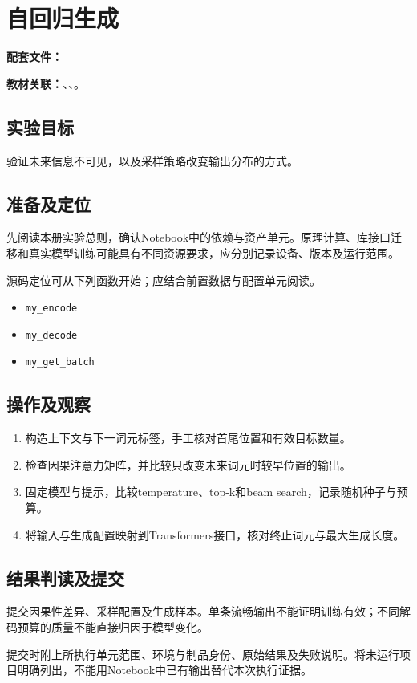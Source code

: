 \chapter{自回归生成}
\label{lab:31_nlp_gpt}

\noindent\textbf{配套文件：}\par
\noindent\textbf{教材关联：}、、。

\section*{实验目标}
验证未来信息不可见，以及采样策略改变输出分布的方式。

\section*{准备及定位}
先阅读本册实验总则，确认Notebook中的依赖与资产单元。原理计算、库接口迁移和真实模型训练可能具有不同资源要求，应分别记录设备、版本及运行范围。

源码定位可从下列函数开始；应结合前置数据与配置单元阅读。
\begin{itemize}
\item \texttt{my\_encode}
\item \texttt{my\_decode}
\item \texttt{my\_get\_batch}
\end{itemize}

\section*{操作及观察}
\begin{enumerate}
\item 构造上下文与下一词元标签，手工核对首尾位置和有效目标数量。
\item 检查因果注意力矩阵，并比较只改变未来词元时较早位置的输出。
\item 固定模型与提示，比较temperature、top-k和beam search，记录随机种子与预算。
\item 将输入与生成配置映射到Transformers接口，核对终止词元与最大生成长度。
\end{enumerate}

\section*{结果判读及提交}
提交因果性差异、采样配置及生成样本。单条流畅输出不能证明训练有效；不同解码预算的质量不能直接归因于模型变化。

提交时附上所执行单元范围、环境与制品身份、原始结果及失败说明。将未运行项目明确列出，不能用Notebook中已有输出替代本次执行证据。

